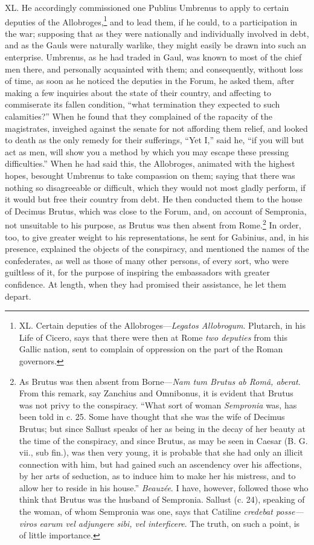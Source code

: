 XL. He accordingly commissioned one Publius Umbrenus to apply to
certain deputies of the Allobroges,\footnote{XL. Certain deputies of the Allobroges—\emph{Legatos Allobrogum}.
Plutarch, in his Life of Cicero, says that there were then at Rome
\emph{two deputies} from this Gallic nation, sent to complain of oppression
on the part of the Roman governors.} and to lead them, if he
could, to a participation in the war; supposing that as they were
nationally and individually involved in debt, and as the Gauls were
naturally warlike, they might easily be drawn into such an enterprise.
Umbrenus, as he had traded in Gaul, was known to most of the chief men
there, and personally acquainted with them; and consequently, without
loss of time, as soon as he noticed the deputies in the Forum, he
asked them, after making a few inquiries about the state of their
country, and affecting to commiserate its fallen condition, ``what
termination they expected to such calamities?'' When he found that they
complained of the rapacity of the magistrates, inveighed against the
senate for not affording them relief, and looked to death as the only
remedy for their sufferings, ``Yet I,'' said he, ``if you will but act as
men, will show you a method by which you may escape these pressing
difficulties.'' When he had said this, the Allobroges, animated with
the highest hopes, besought Umbrenus to take compassion on them;
saying that there was nothing so disagreeable or difficult, which they
would not most gladly perform, if it would but free their country from
debt. He then conducted them to the house of Decimus Brutus, which was
close to the Forum, and, on account of Sempronia, not unsuitable to
his purpose, as Brutus was then absent from Rome.\footnote{As Brutus was then absent from Borne—\emph{Nam tum Brutus ab
Româ, aberat}. From this remark, say Zanchius and Omnibonus, it is
evident that Brutus was not privy to the conspiracy. ``What sort of
woman \emph{Sempronia} was, has been told in c. 25. Some have thought that
she was the wife of Decimus Brutus; but since Sallust speaks of her as
being in the decay of her beauty at the time of the conspiracy, and
since Brutus, as may be seen in Caesar (B. G. vii., sub fin.), was
then very young, it is probable that she had only an illicit
connection with him, but had gained such an ascendency over his
affections, by her arts of seduction, as to induce him to make her his
mistress, and to allow her to reside in his house.'' \emph{Beauzée}. I have,
however, followed those who think that Brutus was the husband of
Sempronia. Sallust (c. 24), speaking of the woman, of whom Sempronia
was one, says that Catiline \emph{credebat posse—viros earum vel adjungere
sibi, vel interficere}. The truth, on such a point, is of little
importance.} In order, too,
to give greater weight to his representations, he sent for Gabinius,
and, in his presence, explained the objects of the conspiracy, and
mentioned the names of the confederates, as well as those of many
other persons, of every sort, who were guiltless of it, for the
purpose of inspiring the embassadors with greater confidence. At
length, when they had promised their assistance, he let them depart.

